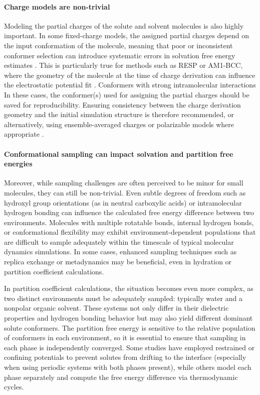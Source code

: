 \documentclass[9pt,bestpractices]{livecoms}
\begin{document}
\paragraph{Charge models are non-trivial}
Modeling the partial charges of the solute and solvent molecules is also highly important. In some fixed-charge models, the assigned partial charges depend on the input conformation of the molecule, meaning that poor or inconsistent conformer selection can introduce systematic errors in solvation free energy estimates \cite{jakalian2000, jambeck2003}. This is particularly true for methods such as RESP or AM1-BCC, where the geometry of the molecule at the time of charge derivation can influence the electrostatic potential fit \cite{jakalian2000, basma2001, zhang2011, dupradeau2010, osato2025}.  Conformers with strong intramolecular interactions In these cases, the conformer(s) used for assigning the partial charges should be saved for reproducibility. Ensuring consistency between the charge derivation geometry and the initial simulation structure is therefore recommended, or alternatively, using ensemble-averaged charges or polarizable models where appropriate \cite{ren2002,lemkul2016}.

\paragraph{Conformational sampling can impact solvation and partition free energies}
Moreover, while sampling challenges are often perceived to be minor for small molecules, they can still be non-trivial. Even subtle degrees of freedom such as hydroxyl group orientations (as in neutral carboxylic acids) or intramolecular hydrogen bonding can influence the calculated free energy difference between two environments\cite{klimovich2010predicting, lim2019assessing}. Molecules with multiple rotatable bonds, internal hydrogen bonds, or conformational flexibility may exhibit environment-dependent populations that are difficult to sample adequately within the timescale of typical molecular dynamics simulations. In some cases, enhanced sampling techniques such as replica exchange or metadynamics may be beneficial, even in hydration or partition coefficient calculations.

In partition coefficient calculations, the situation becomes even more complex, as two distinct environments must be adequately sampled: typically water and a nonpolar organic solvent. These systems not only differ in their dielectric properties and hydrogen bonding behavior but may also yield different dominant solute conformers. The partition free energy is sensitive to the relative population of conformers in each environment, so it is essential to ensure that sampling in each phase is independently converged. Some studies have employed restrained or confining potentials to prevent solutes from drifting to the interface (especially when using periodic systems with both phases present), while others model each phase separately and compute the free energy difference via thermodynamic cycles\cite{turchi2019,bannan2016,petris2021}.
\end{document}
